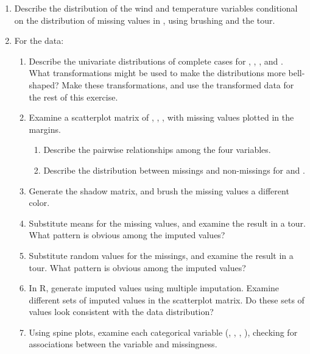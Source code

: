 \begin{enumerate}
\item
Describe the distribution of the wind and temperature variables
conditional on the distribution of missing values in ,
using brushing and the tour.
\item
For the  data:
\begin{enumerate}
\item Describe the univariate distributions of complete cases for 
, , , and . 
What transformations might be used to make the distributions more
bell-shaped? Make these transformations, and use the transformed
data for the rest of this exercise.
\item Examine a scatterplot matrix of , , , 
 with missing values plotted in the margins. 
  \begin{enumerate}
     \item Describe the pairwise relationships among the four variables.
     \item Describe the distribution between missings and non-missings
         for  and . %
  \end{enumerate}
\item Generate the shadow matrix, and brush the missing values a
different color.
\item Substitute means for the missing values, and examine the result
in a tour.  What pattern is obvious among the imputed values? 
\item Substitute random values for the missings, and examine the result
in a tour.  What pattern is obvious among the imputed values? 
\item In R, generate imputed values using multiple imputation. 
Examine different sets of imputed values in the scatterplot matrix. Do
these sets of values look consistent with the data distribution?
\item Using spine plots, examine each categorical variable
(, , , ), checking for
associations between the variable and missingness.
\end{enumerate}
\end{enumerate}

